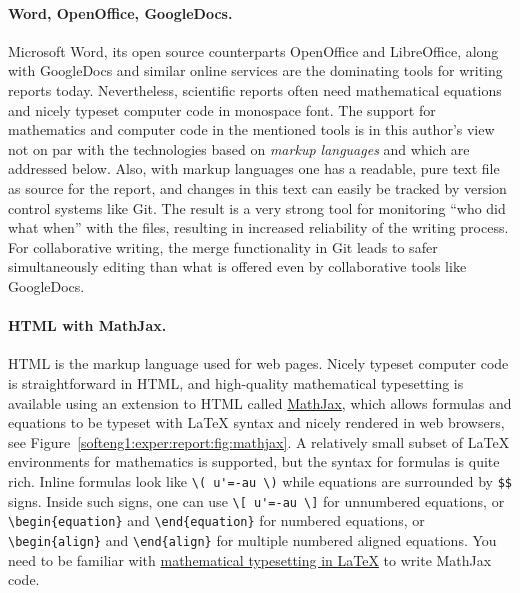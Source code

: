 \documentclass[graybox,sectrefs,envcountresetchap,open=right,final]{svmonodo}
\begin{document}
\paragraph{Word, OpenOffice, GoogleDocs.}
Microsoft Word, its open source counterparts OpenOffice and
LibreOffice, along with GoogleDocs and similar online services are the
dominating tools for writing reports today. Nevertheless, scientific
reports often need mathematical equations and nicely typeset computer
code in monospace font. The support for mathematics and computer code
in the mentioned tools is in this author's view not on par with the
technologies based on \emph{markup languages} and which are addressed
below. Also, with markup languages one has a readable, pure text file
as source for the report, and changes in this text can easily be
tracked by version control systems like Git. The result is a very
strong tool for monitoring ``who did what when'' with the files,
resulting in increased reliability of the writing process. For
collaborative writing, the merge functionality in Git leads to safer
simultaneously editing than what is offered even by collaborative
tools like GoogleDocs.




\paragraph{HTML with MathJax.}
HTML is the markup language used for web pages.  Nicely typeset computer
code is straightforward in HTML, and high-quality mathematical
typesetting is available using an extension to HTML called \href{{http://www.mathjax.org/}}{MathJax}, which allows formulas and equations to be
typeset with {\LaTeX} syntax and nicely rendered in web browsers, see
Figure~\ref{softeng1:exper:report:fig:mathjax}.  A relatively small
subset of {\LaTeX} environments for mathematics is supported, but the
syntax for formulas is quite rich. Inline formulas look like \Verb!\( u'=-au \)! while equations are surrounded by \Verb!$$! signs.  Inside such
signs, one can use \Verb!\[ u'=-au \]! for unnumbered equations, or
\Verb!\begin{equation}! and \Verb!\end{equation}! for
numbered equations, or \Verb!\begin{align}! and \Verb!\end{align}! for multiple
numbered aligned equations.  You need to be familiar with \href{{http://en.wikibooks.org/wiki/LaTeX/Mathematics}}{mathematical
typesetting in LaTeX} to write MathJax
code.
\end{document}
